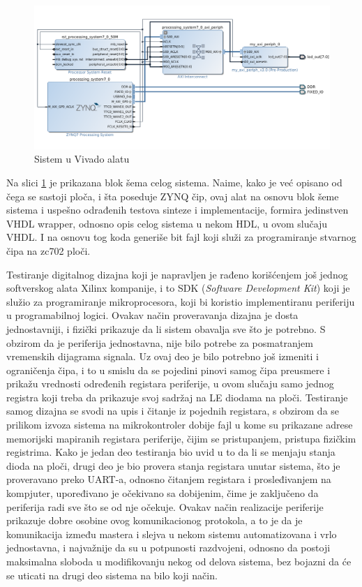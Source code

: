 \documentclass[a4paper, 12pt, diplomski]{etf}
\begin{document}
	\begin{figure}[htb]
		\centering
		\includegraphics[width=.8\textwidth]{images/zc702system_vivado.png}
		\caption{Sistem u Vivado alatu}
		\label{fig:vivadosystem}
	\end{figure}

	Na slici \ref{fig:vivadosystem} je prikazana blok šema celog sistema. Naime, kako je već opisano od čega se sastoji ploča, i šta poseduje ZYNQ čip, ovaj alat na osnovu blok šeme sistema i uspešno odrađenih testova sinteze i implementacije, formira jedinstven VHDL wrapper, odnosno opis celog sistema u nekom HDL, u ovom slučaju VHDL. I na osnovu tog koda generiše bit fajl koji služi za programiranje stvarnog čipa na zc702 ploči.

	Testiranje digitalnog dizajna koji je napravljen je rađeno korišćenjem još jednog softverskog alata Xilinx kompanije, i to SDK (\textit{Software Development Kit}) koji je služio za programiranje mikroprocesora, koji bi koristio implementiranu periferiju u programabilnoj logici. Ovakav način proveravanja dizajna je dosta jednostavniji, i fizički prikazuje da li sistem obavalja sve što je potrebno. S obzirom da je periferija jednostavna, nije bilo potrebe za posmatranjem vremenskih dijagrama signala. Uz ovaj deo je bilo potrebno još izmeniti i ograničenja čipa, i to u smislu da se pojedini pinovi samog čipa preusmere i prikažu vrednosti određenih registara periferije, u ovom slučaju samo jednog registra koji treba da prikazuje svoj sadržaj na LE diodama na ploči. Testiranje samog dizajna se svodi na upis i čitanje iz pojednih registara, s obzirom da se prilikom izvoza sistema na mikrokontroler dobije fajl u kome su prikazane adrese memorijski mapiranih registara periferije, čijim se pristupanjem, pristupa fizičkim registrima. Kako je jedan deo testiranja bio uvid u to da li se menjaju stanja dioda na ploči, drugi deo je bio provera stanja registara unutar sistema, što je proveravano preko UART-a, odnosno čitanjem registara i prosleđivanjem na kompjuter, upoređivano je očekivano sa dobijenim, čime je zaključeno da periferija radi sve što se od nje očekuje. Ovakav način realizacije periferije prikazuje dobre osobine ovog komunikacionog protokola, a to je da je komunikacija između mastera i slejva u nekom sistemu automatizovana i vrlo jednostavna, i najvažnije da su u potpunosti razdvojeni, odnosno da postoji maksimalna sloboda u modifikovanju nekog od delova sistema, bez bojazni da će se uticati na drugi deo sistema na bilo koji način.
\end{document}
